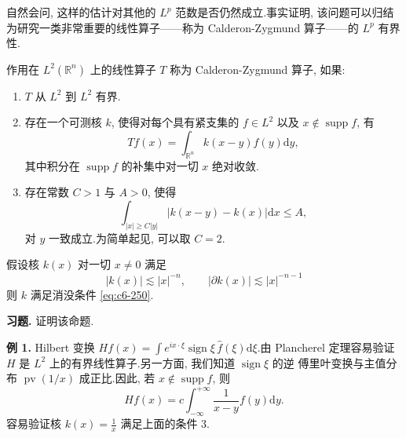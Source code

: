 自然会问, 这样的估计对其他的 $L^p$ 范数是否仍然成立.事实证明, 该问题可以归结为研究一类非常重要的线性算子——称为 Calderon-Zygmund 算子——的 $L^p$ 有界性.

\begin{definition}\label{def:c6-6.1}
作用在 $L^2(\mathbb{R}^n)$ 上的线性算子 $T$ 称为 Calderon-Zygmund 算子, 如果:
\begin{enumerate}
\item $T$ 从 $L^2$ 到 $L^2$ 有界.
\item 存在一个可测核 $k$, 使得对每个具有紧支集的 $f \in L^2$ 以及 $x \notin \operatorname{supp} f$, 有
\[
Tf(x) = \int_{\mathbb{R}^n} k(x-y) f(y) \mathrm{d}y,
\]
其中积分在 $\operatorname{supp} f$ 的补集中对一切 $x$ 绝对收敛.
\item 存在常数 $C > 1$ 与 $A > 0$, 使得
\begin{equation}
\int_{|x| \geq C|y|} |k(x-y) - k(x)| \mathrm{d}x \leq A, \label{eq:c6-250}
\end{equation}
对 $y$ 一致成立.为简单起见, 可以取 $C = 2$.
\end{enumerate}
\end{definition}

\begin{proposition}\label{prop:c6-6.2}
假设核 $k(x)$ 对一切 $x \neq 0$ 满足
\begin{equation}
|k(x)| \lesssim |x|^{-n}, \qquad |\partial k(x)| \lesssim |x|^{-n-1}\label{eq:c6-251}
\end{equation}
则 $k$ 满足消没条件 \eqref{eq:c6-250}.
\end{proposition}

\textbf{习题.} 证明该命题.

\textbf{例 1.} Hilbert 变换 $Hf(x) = \int e^{ix \cdot \xi} \operatorname{sign} \xi\, \hat{f}(\xi) \mathrm{d}\xi$.由 Plancherel 定理容易验证 $H$ 是 $L^2$ 上的有界线性算子.另一方面, 我们知道 $\operatorname{sign} \xi$ 的逆 傅里叶变换与主值分布 $\operatorname{pv}(1/x)$ 成正比.因此, 若 $x \notin \operatorname{supp} f$, 则
\[
Hf(x) = c \int_{-\infty}^{+\infty} \frac{1}{x-y} f(y) \mathrm{d}y.
\]
容易验证核 $k(x) = \frac{1}{x}$ 满足上面的条件 3.

